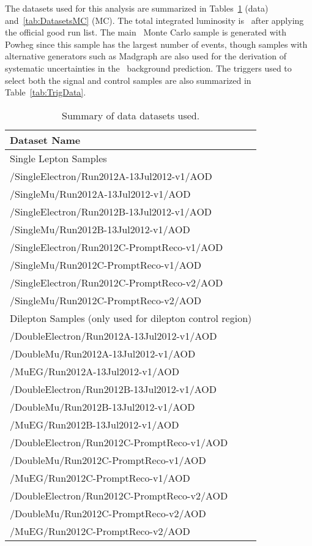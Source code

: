 
The datasets used for this analysis are summarized in 
Tables~\ref{tab:DatasetsData} (data) and~\ref{tab:DatasetsMC} (MC).
The total integrated luminosity is \lumi\ after
applying the official good run list. 
The main \ttbar\ Monte Carlo
sample is generated with Powheg since this sample has the largest number of events, 
though samples with alternative generators such as Madgraph %
are also used for
the derivation of systematic uncertainties in the \ttbar~background prediction. 
The triggers used to select both the signal and control samples are
also summarized in Table~\ref{tab:TrigData}.

\begin{table}[!ht]
\begin{center}
\begin{tabular}{l}
\hline
Dataset Name   \\
\hline
\hline
Single Lepton Samples \\
\hline
  /SingleElectron/Run2012A-13Jul2012-v1/AOD   \\
  /SingleMu/Run2012A-13Jul2012-v1/AOD   \\
  /SingleElectron/Run2012B-13Jul2012-v1/AOD   \\
  /SingleMu/Run2012B-13Jul2012-v1/AOD   \\
  /SingleElectron/Run2012C-PromptReco-v1/AOD   \\         
  /SingleMu/Run2012C-PromptReco-v1/AOD   \\         
  /SingleElectron/Run2012C-PromptReco-v2/AOD   \\         
  /SingleMu/Run2012C-PromptReco-v2/AOD   \\         
\hline
\hline
Dilepton Samples (only used for dilepton control region)\\
\hline
  /DoubleElectron/Run2012A-13Jul2012-v1/AOD   \\
  /DoubleMu/Run2012A-13Jul2012-v1/AOD   \\
  /MuEG/Run2012A-13Jul2012-v1/AOD   \\
  /DoubleElectron/Run2012B-13Jul2012-v1/AOD   \\
  /DoubleMu/Run2012B-13Jul2012-v1/AOD   \\
  /MuEG/Run2012B-13Jul2012-v1/AOD   \\
  /DoubleElectron/Run2012C-PromptReco-v1/AOD   \\         
  /DoubleMu/Run2012C-PromptReco-v1/AOD   \\         
  /MuEG/Run2012C-PromptReco-v1/AOD   \\         
  /DoubleElectron/Run2012C-PromptReco-v2/AOD   \\         
  /DoubleMu/Run2012C-PromptReco-v2/AOD   \\         
  /MuEG/Run2012C-PromptReco-v2/AOD   \\         
\hline
\end{tabular}
\caption{Summary of data datasets used.\label{tab:DatasetsData}}
\end{center}
\end{table}

